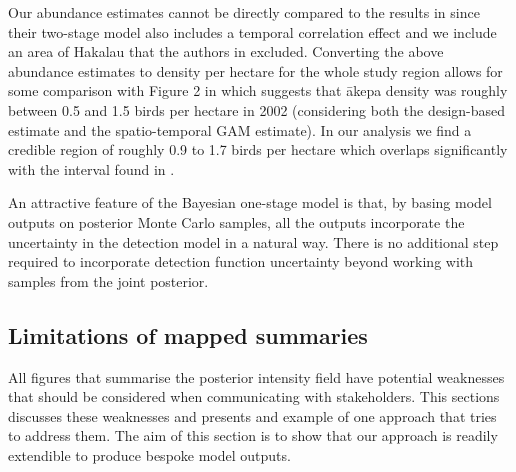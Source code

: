 \documentclass{statsoc}
\newcommand{\akepa}{\textquotesingle\={a}kepa}  %
\begin{document}
Our abundance estimates cannot be directly compared to the results in \cite{camp_dsm_2020} since their two-stage model also includes a temporal correlation effect and we include an area of Hakalau that the authors in \cite{camp_dsm_2020} excluded.  Converting the above abundance estimates to density per hectare for the whole study region allows for some comparison with Figure 2 in \cite{camp_dsm_2020} which suggests that \akepa{} density was roughly between 0.5 and 1.5 birds per hectare in 2002 (considering both the design-based estimate and the spatio-temporal GAM estimate).  In our analysis we find a credible region of roughly 0.9 to 1.7 birds per hectare which overlaps significantly with the interval found in \cite{camp_dsm_2020}.

An attractive feature of the Bayesian one-stage model is that, by basing model outputs on posterior Monte Carlo samples, all the outputs incorporate the uncertainty in the detection model in a natural way.  There is no additional step required to incorporate detection function uncertainty beyond working with samples from the joint posterior.

\subsection{Limitations of mapped summaries}

All figures that summarise the posterior intensity field have potential weaknesses that should be considered when communicating with stakeholders.  This sections discusses these weaknesses and presents and example of one approach that tries to address them.  The aim of this section is to show that our approach is readily extendible to produce bespoke model outputs.
\end{document}
